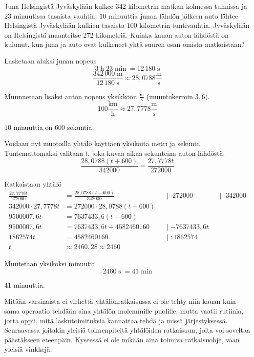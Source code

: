 \begin{esimerkki}
	Juna Helsingistä Jyväskylään kulkee $342$ kilometrin matkan kolmessa tunnissa ja $23$ minuutissa tasaista vauhtia.
	$10$ minuuttia junan lähdön jälkeen auto lähtee Helsingistä Jyväskylään kulkien tasaista $100$ kilometrin tuntivauhtia.
	Jyväskylään on Helsingistä maanteitse $272$ kilometriä.
	Kuinka kauan auton lähdöstä on kulunut, kun juna ja auto ovat kulkeneet yhtä suuren osan omista matkoistaan?
	\begin{esimratk}
		Lasketaan aluksi junan nopeus
		\[ 3 \; \text{h} \; 23 \; \text{min} \; = 12\,180 \; \text{s} \]
		\[ \frac{342\,000 \; \text{m}}{12\,180 \; \text{s}} \approx  28,0788 \frac{\text{m}}{\text{s}} \]
		
		Muunnetaan lisäksi auton nopeus yksikköön $\frac{\text{m}}{\text{s}}$ (muuntokerroin $3,6$).
		\[ 100 \frac{\text{km}}{\text{h}} \approx 27,7778 \frac{\text{m}}{\text{s}} \]
		
		$10$ minuuttia on $600$ sekuntia.
		
		Voidaan nyt muotoilla yhtälö käyttäen yksiköitä metri ja sekunti. Tuntemattomaksi valitaan $t$, joka kuvaa aikaa sekunteina auton lähdöstä.
		\[ \frac{28,0788(t+600)}{342000} = \frac{27,7778t}{272000} \]
		
		Ratkaistaan yhtälö
		\begin{align*}
			\frac{27,7778t}{272000} &= \frac{28,0788(t+600)}{342000} &&\text{| $\cdot{272000}$} &&\text{| $\cdot{342000}$}  \\
			342000 \cdot 27,7778t &= 272000 \cdot 28,0788(t+600) \\
			9500007,6t &= 7637433,6(t+600) \\
			9500007,6t &= 7637433,6t + 4582460160 &&\text{| $-7637433,6t$} \\ 
			1862574t &= 4582460160 &&\text{| $:{1862574}$} \\
			t &\approx 2460,28 \approx 2460
		\end{align*}
		
		Muutetaan yksiköksi minuutit
		\[ 2460 \; \text{s} \; = 41 \; \text{min} \]
	\end{esimratk}
	\begin{esimvast}
		$41$ minuuttia.
	\end{esimvast}
\end{esimerkki}

Mitään varsinaista ei virhettä yhtälönratkaisussa ei ole tehty niin kauan kuin sama operaatio tehdään aina yhtälön molemmille puolille, mutta vaatii rutiinia, jotta oppii, mitä laskutoimituksia kannattaa tehdä ja missä järjestyksessä. Seuraavassa joitakin yleisiä toimenpiteitä yhtälöiden ratkaisuun, joita voi soveltaa päästäkseen eteenpäin. Kyseessä ei ole mikään aina toimiva ratkaisuohje, vaan yleisiä vinkkejä.

